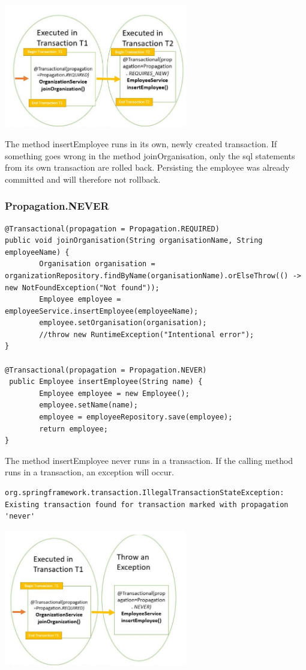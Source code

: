 \includegraphics[width=8cm]{./images/jpa/transaction_propagation_4}

The method insertEmployee runs in its own, newly created transaction. If something goes wrong in the method joinOrganisation, only the sql statements from its own transaction are rolled back. Persisting the employee was already committed and will therefore not rollback.

\subsubsection{Propagation.NEVER}

\begin{lstlisting}
@Transactional(propagation = Propagation.REQUIRED)
public void joinOrganisation(String organisationName, String employeeName) {
        Organisation organisation = organizationRepository.findByName(organisationName).orElseThrow(() -> new NotFoundException("Not found"));
        Employee employee = employeeService.insertEmployee(employeeName);
        employee.setOrganisation(organisation);
        //throw new RuntimeException("Intentional error");
}

@Transactional(propagation = Propagation.NEVER)
 public Employee insertEmployee(String name) {
        Employee employee = new Employee();
        employee.setName(name);
        employee = employeeRepository.save(employee);
        return employee;
}
\end{lstlisting}

The method insertEmployee never runs in a transaction. If the calling method
runs in a transaction, an exception will occur.

\begin{verbatim}
org.springframework.transaction.IllegalTransactionStateException: Existing transaction found for transaction marked with propagation 'never'
\end{verbatim}

\includegraphics[width=8cm]{./images/jpa/transaction_propagation_5}

